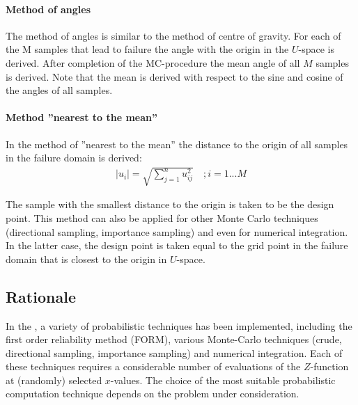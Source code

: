 \paragraph*{Method of angles}

The method of angles is similar to the method of centre of gravity. For each of the M samples that lead to failure the angle with the origin in the $U$-space is derived. After completion of the MC-procedure the mean angle of all $M$ samples is derived. Note that the mean is derived with respect to the sine and cosine of the angles of all samples. 

\paragraph*{Method ''nearest to the mean''}

In the method of ''nearest to the mean'' the distance to the origin of all samples in the failure domain is derived: 
\begin{align}
\left|u_{i} \right|=\sqrt{\sum _{j=1}^{n}u_{ij} ^{2}  } \quad ;i=1...M \label{eq:2-62} 
\end{align}

The sample with the smallest distance to the origin is taken to be the design point. This method can also be applied for other Monte Carlo techniques (directional sampling, importance sampling) and even for numerical integration. In the latter case, the design point is taken equal to the grid point in the failure domain that is closest to the origin in $U$-space. 

\subsection{Rationale}\label{Section_2.3.8}

In the \probLib, a variety of probabilistic techniques has been implemented, including the first order reliability method (FORM), various Monte-Carlo techniques (crude, directional sampling, importance sampling) and numerical integration. Each of these techniques requires a considerable number of evaluations of the $Z$-function at (randomly) selected $x$-values. The choice of the most suitable probabilistic computation technique depends on the problem under consideration. 

